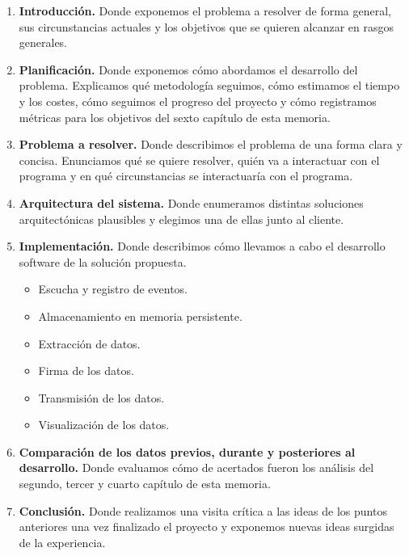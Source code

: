 \begin{enumerate}
    \item \textbf{Introducción.} Donde exponemos el problema a resolver de forma general,
    sus circunstancias actuales y los objetivos que se quieren alcanzar en rasgos generales.

    \item \textbf{Planificación.} Donde exponemos cómo abordamos el desarrollo del problema.
    Explicamos qué metodología seguimos, cómo estimamos el tiempo y los costes, cómo seguimos el progreso
    del proyecto y cómo registramos métricas para los objetivos del sexto capítulo de esta memoria.

    \item \textbf{Problema a resolver.} Donde describimos el problema de una forma clara y concisa.
    Enunciamos qué se quiere resolver, quién va a interactuar con el programa y en qué circunstancias
    se interactuaría con el programa.

    \item \textbf{Arquitectura del sistema.} Donde enumeramos distintas soluciones arquitectónicas
    plausibles y elegimos una de ellas junto al cliente.

    \item \textbf{Implementación.} Donde describimos cómo llevamos a cabo el desarrollo software
    de la solución propuesta.
    \begin{itemize}
        \item Escucha y registro de eventos.
        \item Almacenamiento en memoria persistente.
        \item Extracción de datos.
        \item Firma de los datos.
        \item Transmisión de los datos.
        \item Visualización de los datos.
    \end{itemize}

    \item \textbf{Comparación de los datos previos, durante y posteriores al desarrollo.} Donde evaluamos cómo de
    acertados fueron los análisis del segundo, tercer y cuarto capítulo de esta memoria.

    \item \textbf{Conclusión.} Donde realizamos una visita crítica a las ideas de los puntos
    anteriores una vez finalizado el proyecto y exponemos nuevas ideas surgidas de la experiencia.
\end{enumerate}
